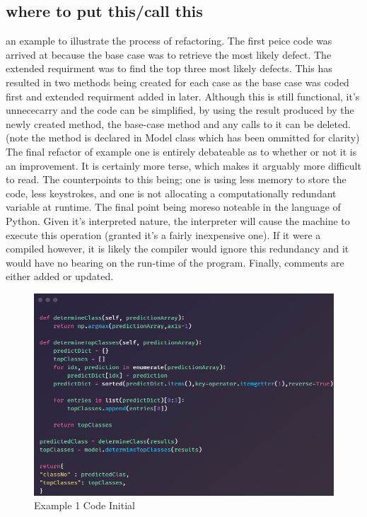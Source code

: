       \subsection{where to put this/call this}
      an example to illustrate the process of refactoring. The first peice code was arrived at because the base case was to retrieve the most likely defect. The extended requirment was to find the top three most likely defects. This has resulted in two methods being created for each case as the base case was coded first and extended requirment added in later. Although this is still functional, it's unnececarry and the code can be simplified, by using the result produced by the newly created method, the base-case method and any calls to it can be deleted. (note the method is declared in Model class which has been ommitted for clarity) The final refactor of example one is entirely debateable as to whether or not it is an improvement. It is certainly more terse, which makes it arguably more difficult to read. The counterpoints to this being; one is using less memory to store the code, less keystrokes, and one is not allocating a computationally redundant variable at runtime. The final point being moreso noteable in the language of Python. Given it's interpreted nature, the interpreter will cause the machine to execute this operation (granted it's a fairly inexpensive one). If it were a compiled however, it is likely the compiler would ignore this redundancy and it would have no bearing on the run-time of the program. Finally, comments are either added or updated.

      \begin{figure}[H]
        \begin{center}
          \includegraphics[scale=0.55]{Images/Refactor/refactorA1}
          \caption{Example 1 Code Initial}
          \label{fig:refactorA1}
        \end{center}
      \end{figure}

